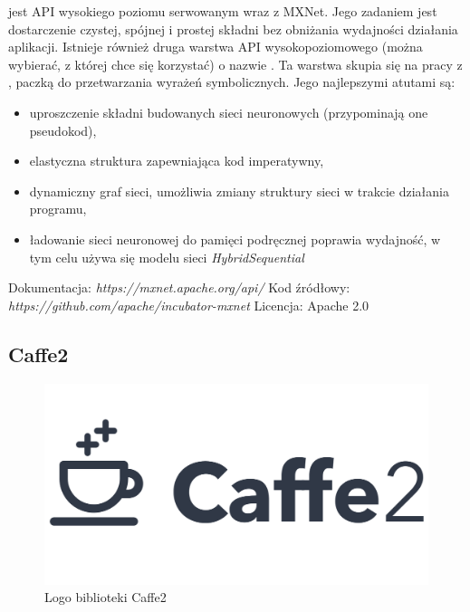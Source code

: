 \documentclass[12pt,a4paper,twoside,titlepage,openright]{book}
\begin{document}
\begin{itemize}
 jest API wysokiego poziomu serwowanym wraz z MXNet. Jego zadaniem jest dostarczenie czystej, spójnej i prostej składni bez obniżania wydajności działania aplikacji. Istnieje również druga warstwa API wysokopoziomowego (można wybierać, z której chce się korzystać) o nazwie . Ta warstwa skupia się na pracy z , paczką do przetwarzania wyrażeń symbolicznych. \cite{DBLP:journals/corr/ChenLLLWWXXZZ15} Jego najlepszymi atutami są:
\begin{itemize}
\item uproszczenie składni budowanych sieci neuronowych (przypominają one pseudokod),
\item elastyczna struktura zapewniająca kod imperatywny,
\item dynamiczny graf sieci, umożliwia zmiany struktury sieci w trakcie działania programu,
\item ładowanie sieci neuronowej do pamięci podręcznej poprawia wydajność, w tym celu używa się modelu sieci \textit{HybridSequential}
\end{itemize}

\noindent 
\newline
Dokumentacja: \textit{https://mxnet.apache.org/api/}
\newline
Kod źródłowy: \textit{https://github.com/apache/incubator-mxnet}
\newline
Licencja: Apache 2.0

\subsection{Caffe2}
\begin{figure}[h]
	\centering
			\includegraphics[resolution=100, scale=0.35]{Caffe2.png}
		\caption{Logo biblioteki Caffe2}
\end{figure}


\end{itemize}
\end{document}
